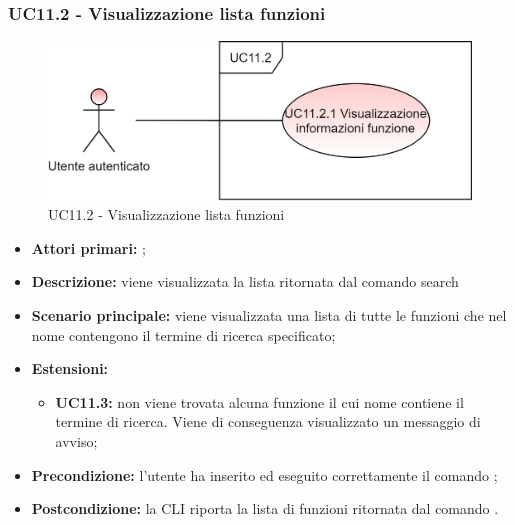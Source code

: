\subsubsection{UC11.2 - Visualizzazione lista funzioni}
\begin{figure}[H]
	\centering
	\includegraphics[scale=\ucs]{./res/img/UC11.2.png}
	\caption {UC11.2 - Visualizzazione lista funzioni}
\end{figure}
\begin{itemize}
	\item \textbf{Attori primari:} \ua{};
	\item \textbf{Descrizione:} viene visualizzata la lista ritornata dal comando search
	\item \textbf{Scenario principale:} viene visualizzata una lista di tutte le funzioni che nel nome contengono il termine di ricerca specificato;
	\item \textbf{Estensioni:} 
	\begin{itemize}
		\item \textbf{UC11.3:} non viene trovata alcuna funzione il cui nome contiene il termine di ricerca. Viene di conseguenza visualizzato un messaggio di avviso;
	\end{itemize}
	\item \textbf{Precondizione:} l’utente ha inserito ed eseguito correttamente il comando \search{};
	\item \textbf{Postcondizione:} la CLI riporta la lista di funzioni ritornata dal comando \search{}.
\end{itemize}